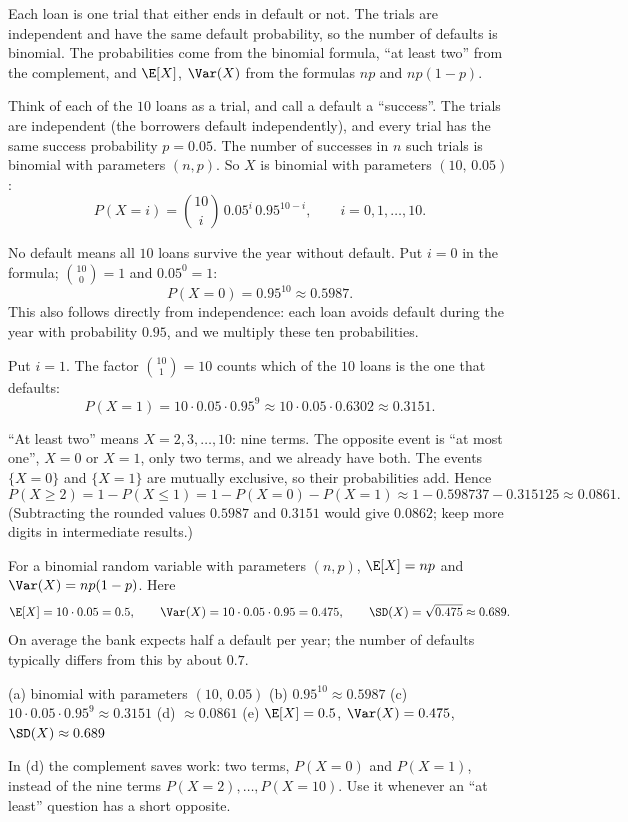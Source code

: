 \begin{solution}
	\idea Each loan is one trial that either ends in default or not. The
	trials are independent and have the same default probability, so the
	number of defaults is binomial. The probabilities come from the binomial
	formula, ``at least two'' from the complement, and $\E[X]$, $\Var(X)$ from
	the formulas $np$ and $np(1-p)$.

	 Think of each of the $10$ loans as a trial, and call a default
	a ``success''. The trials are independent (the borrowers default
	independently), and every trial has the same success probability
	$p=0.05$. The number of successes in $n$ such trials is binomial with
	parameters $(n,p)$. So $X$ is binomial with parameters $(10,\,0.05)$:
	\[ P(X=i)=\binom{10}{i}\,0.05^i\,0.95^{10-i},\qquad i=0,1,\dots,10. \]

	 No default means all $10$ loans survive the year without
	default. Put $i=0$ in the
	formula; $\binom{10}{0}=1$ and $0.05^0=1$:
	\[ P(X=0)=0.95^{10}\approx0.5987. \]
	This also follows directly from independence: each loan avoids default
	during the year with probability $0.95$, and we multiply these ten probabilities.

	 Put $i=1$. The factor $\binom{10}{1}=10$ counts which of the
	$10$ loans is the one that defaults:
	\[ P(X=1)=10\cdot0.05\cdot0.95^{9}\approx10\cdot0.05\cdot0.6302
		\approx0.3151. \]

	 ``At least two'' means $X=2,3,\dots,10$: nine terms. The
	opposite event is ``at most one'', $X=0$ or $X=1$, only two terms, and we
	already have both. The events $\{X=0\}$ and $\{X=1\}$ are mutually
	exclusive, so their probabilities add. Hence
	\[ P(X\ge2)=1-P(X\le1)=1-P(X=0)-P(X=1)\approx1-0.598737-0.315125
		\approx0.0861. \]
	(Subtracting the rounded values $0.5987$ and $0.3151$ would give $0.0862$;
	keep more digits in intermediate results.)

	 For a binomial random variable with parameters $(n,p)$,
	$\E[X]=np$ and $\Var(X)=np(1-p)$. Here
	\[ \E[X]=10\cdot0.05=0.5,\qquad \Var(X)=10\cdot0.05\cdot0.95=0.475,\qquad
		\SD(X)=\sqrt{0.475}\approx0.689. \]
	On average the bank expects half a default per year; the number of
	defaults typically differs from this by about $0.7$.
	\begin{answer}
		(a) binomial with parameters $(10,\,0.05)$ \quad
		(b) $0.95^{10}\approx0.5987$ \quad
		(c) $10\cdot0.05\cdot0.95^9\approx0.3151$ \quad
		(d) $\approx0.0861$ \quad
		(e) $\E[X]=0.5$, $\Var(X)=0.475$, $\SD(X)\approx0.689$
	\end{answer}
	\begin{remark}
		In (d) the complement saves work: two terms, $P(X=0)$ and $P(X=1)$,
		instead of the nine terms $P(X=2),\dots,P(X=10)$. Use it whenever an
		``at least'' question has a short opposite.
	\end{remark}
\end{solution}
